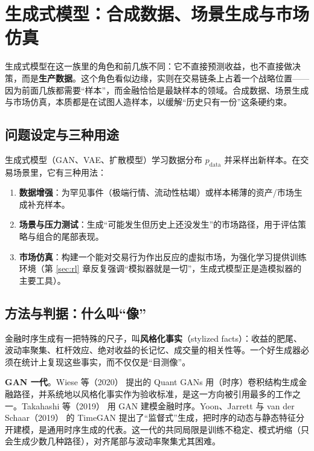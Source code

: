 \section{生成式模型：合成数据、场景生成与市场仿真}\label{sec:gen}

生成式模型在这一族里的角色和前几族不同：它不直接预测收益，也不直接做决策，而是\textbf{生产数据}。这个角色看似边缘，实则在交易链条上占着一个战略位置——因为前面几族都需要“样本”，而金融恰恰是最缺样本的领域。合成数据、场景生成与市场仿真，本质都是在试图人造样本，以缓解“历史只有一份”这条硬约束。

\subsection{问题设定与三种用途}

生成式模型（GAN、VAE、扩散模型）学习数据分布 $p_\text{data}$ 并采样出新样本。在交易场景里，它有三种用法：

\begin{enumerate}
  \item \textbf{数据增强}：为罕见事件（极端行情、流动性枯竭）或样本稀薄的资产/市场生成补充样本。
  \item \textbf{场景与压力测试}：生成“可能发生但历史上还没发生”的市场路径，用于评估策略与组合的尾部表现。
  \item \textbf{市场仿真}：构建一个能对交易行为作出反应的虚拟市场，为强化学习提供训练环境（第 \ref{sec:rl} 章反复强调“模拟器就是一切”，生成式模型正是造模拟器的主要工具）。
\end{enumerate}

\subsection{方法与判据：什么叫“像”}

金融时序生成有一把特殊的尺子，叫\textbf{风格化事实}（stylized facts）：收益的肥尾、波动率聚集、杠杆效应、绝对收益的长记忆、成交量的相关性等。一个好生成器必须在统计上复现这些事实，而不仅仅是“目测像”。

\textbf{GAN 一代}。Wiese 等（2020）\cite{wiese2020quantgan} 提出的 Quant GANs 用（时序）卷积结构生成金融路径，并系统地以风格化事实作为验收标准，是这一方向被引用最多的工作之一。Takahashi 等（2019）\cite{takahashi2019} 用 GAN 建模金融时序。Yoon、Jarrett 与 van der Schaar（2019）\cite{yoon2019timegan} 的 TimeGAN 提出了“监督式”生成，把时序的动态与静态特征分开建模，是通用时序生成的代表。这一代的共同局限是训练不稳定、模式坍缩（只会生成少数几种路径），对齐尾部与波动率聚集尤其困难。

